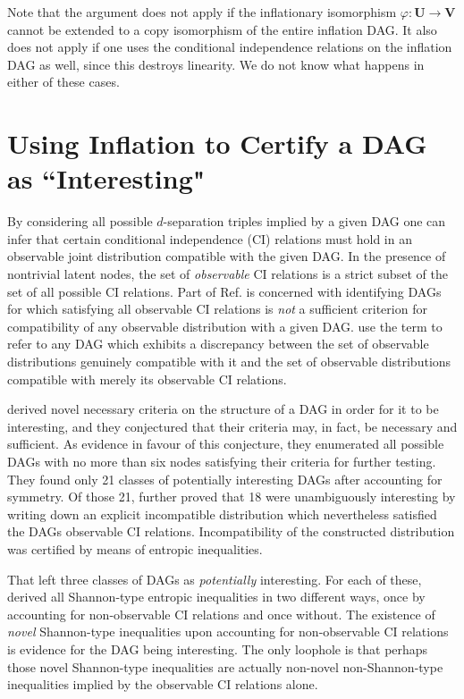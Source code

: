 Note that the argument does not apply if the inflationary isomorphism $\varphi:\bm{U}\to\bm{V}$ cannot be extended to a copy isomorphism of the entire inflation DAG. It also does not apply if one uses the conditional independence relations on the inflation DAG as well, since this destroys linearity. We do not know what happens in either of these cases.





\section{Using Inflation to Certify a DAG as ``Interesting"}

By considering all possible $d$-separation triples implied by a given DAG one can infer that certain conditional independence (CI) relations must hold in an observable joint distribution compatible with the given DAG. In the presence of nontrivial latent nodes, the set of \emph{observable} CI relations is a strict subset of the set of all possible CI relations. Part of Ref. \cite{pusey2014gdag} is concerned with identifying DAGs for which satisfying all observable CI relations is \emph{not} a sufficient criterion for compatibility of any observable distribution with a given DAG. \citet{pusey2014gdag} use the term  to refer to any DAG which exhibits a discrepancy between the set of observable distributions genuinely compatible with it and the set of observable distributions compatible with merely its observable CI relations.

\citet{pusey2014gdag} derived novel necessary criteria on the structure of a DAG in order for it to be interesting, and they conjectured that their criteria may, in fact, be necessary and sufficient. As evidence in favour of this conjecture, they enumerated all possible DAGs with no more than six nodes satisfying their criteria for further testing. They found only 21 classes of potentially interesting DAGs after accounting for symmetry. Of those 21, \citet{pusey2014gdag} further proved that 18 were unambiguously interesting by writing down an explicit incompatible distribution which nevertheless satisfied the DAGs observable CI relations. Incompatibility of the constructed distribution was certified by means of entropic inequalities. 

That left three classes of DAGs as \emph{potentially} interesting. For each of these, \citet{pusey2014gdag} derived all Shannon-type entropic inequalities in two different ways, once by accounting for non-observable CI relations and once without. The existence of \emph{novel} Shannon-type inequalities upon accounting for non-observable CI relations is evidence for the DAG being interesting. The only loophole is that perhaps those novel Shannon-type inequalities are actually non-novel non-Shannon-type inequalities implied by the observable CI relations alone.

